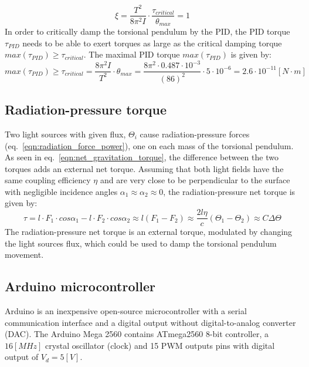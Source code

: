 \documentclass[\main/master.tex]{subfiles}
\begin{document}
\begin{equation}
\xi = \frac{T^2}{ 8 \pi^2 I }\cdot\frac{ \tau_{critical}}{\theta_{max}} = 1 
\label{eqn:damping_ratio_pid}
\end{equation}
In order to critically damp the torsional pendulum by the PID, the PID torque $\tau_{PID}$ needs to be able to exert torques as large as the critical damping torque $max(\tau_{PID}) \geq  \tau_{critical}$. The maximal PID torque $max(\tau_{PID})$ is given by:
\begin{equation}
max(\tau_{PID}) \geq  \tau_{critical} = \frac{ 8 \pi^2 I }{T^2}\cdot\theta_{max} = \frac{ 8 \pi^2 \cdot 0.487\cdot10^{-3} }{(86)^2}\cdot 5\cdot10^{-6} = 2.6\cdot10^{-11}[N\cdot m]
\label{eqn:damping_torque_pid}
\end{equation}
\par\noindent




\subsection{Radiation-pressure torque}
Two light sources with given flux, $\Theta_i$ cause radiation-pressure forces (eq.~\ref{eqn:radiation_force_power}), one on each mass of the torsional pendulum. As seen in eq.~\ref{eqn:net_gravitation_torque}, the difference between the two torques adds an external net torque. Assuming that both light fields have the same coupling efficiency $\eta$ and are very close to be perpendicular to the surface with negligible incidence angles $\alpha_1\approx\alpha_2\approx 0$, the radiation-pressure net torque is given by:  
\begin{equation}
\tau = l\cdot F_1 \cdot cos\alpha_1 - l\cdot F_2 \cdot cos\alpha_2\approx l(F_1 - F_2) \approx \frac{2l\eta}{{c}} (\Theta_1 -\Theta_2)\approx C\Delta \Theta \label{eqn:radiation torque}
\end{equation}
The radiation-pressure net torque is an external torque, modulated by changing the light sources flux, which could be used to damp the torsional pendulum movement.

\subsection{Arduino microcontroller}
Arduino is an inexpensive open-source microcontroller with a serial communication interface and a digital output without digital-to-analog converter (DAC). The Arduino Mega 2560 contains ATmega2560 8-bit controller, a $16 [MHz]$ crystal oscillator (clock) and 15 PWM outputs pins with digital output of $V_d = 5[V]$.
\end{document}
